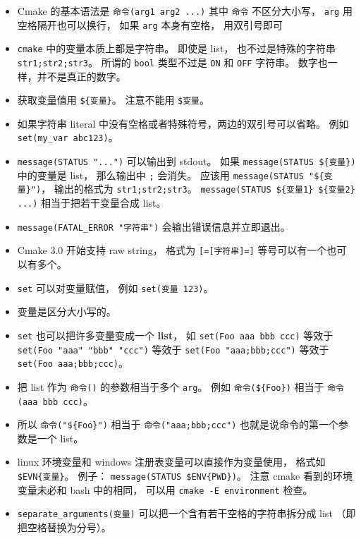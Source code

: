 \begin{itemize}
\item Cmake 的基本语法是 \verb`命令(arg1 arg2 ...)` 其中 \verb`命令` 不区分大小写， \verb`arg` 用空格隔开也可以换行， 如果 \verb`arg` 本身有空格， 用双引号即可
\item \verb`cmake` 中的变量本质上都是字符串。 即使是 list， 也不过是特殊的字符串 \verb`str1;str2;str3`。 所谓的 \verb`bool` 类型不过是 \verb`ON` 和 \verb`OFF` 字符串。 数字也一样，并不是真正的数字。
\item 获取变量值用 \verb`${变量}`。 注意不能用 \verb`$变量`。
\item 如果字符串 literal 中没有空格或者特殊符号，两边的双引号可以省略。 例如 \verb`set(my_var abc123)`。
\item \verb`message(STATUS "...")` 可以输出到 stdout。 如果 \verb`message(STATUS ${变量})` 中的变量是 list， 那么输出中 \verb`;` 会消失。 应该用 \verb`message(STATUS "${变量}")`， 输出的格式为 \verb`str1;str2;str3`。 \verb`message(STATUS ${变量1} ${变量2} ...)` 相当于把若干变量合成 list。
\item \verb`message(FATAL_ERROR "字符串")` 会输出错误信息并立即退出。
\item Cmake 3.0 开始支持 raw string， 格式为 \verb`[=[字符串]=]` 等号可以有一个也可以有多个。
\item \verb`set` 可以对变量赋值， 例如 \verb`set(变量 123)`。
\item 变量是区分大小写的。
\item \verb`set` 也可以把许多变量变成一个 \textbf{list}， 如 \verb`set(Foo aaa bbb ccc)` 等效于 \verb`set(Foo "aaa" "bbb" "ccc")` 等效于 \verb`set(Foo "aaa;bbb;ccc")` 等效于 \verb`set(Foo aaa;bbb;ccc)`。
\item 把 list 作为 \verb`命令()` 的参数相当于多个 \verb`arg`。 例如 \verb`命令(${Foo})` 相当于 \verb`命令(aaa bbb ccc)`。
\item 所以 \verb`命令("${Foo}")` 相当于 \verb`命令("aaa;bbb;ccc")` 也就是说命令的第一个参数是一个 list。
\item linux 环境变量和 windows 注册表变量可以直接作为变量使用， 格式如 \verb`$EVN{变量}`。 例子： \verb`message(STATUS $ENV{PWD})`。 注意 cmake 看到的环境变量未必和 bash 中的相同， 可以用 \verb`cmake -E environment` 检查。
\item \verb`separate_arguments(变量)` 可以把一个含有若干空格的字符串拆分成 list （即把空格替换为分号）。
\end{itemize}

